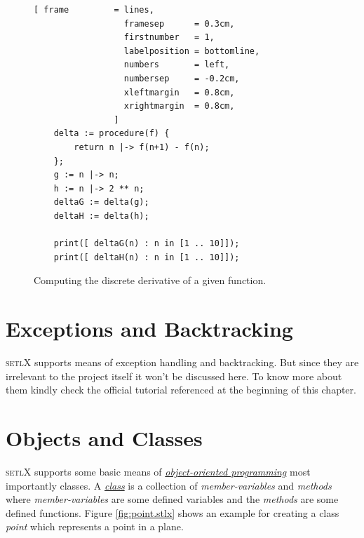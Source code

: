 \documentclass[11pt]{report}
\begin{document}
\begin{figure}[!ht]
\centering
\begin{Verbatim}[ frame         = lines, 
                  framesep      = 0.3cm, 
                  firstnumber   = 1,
                  labelposition = bottomline,
                  numbers       = left,
                  numbersep     = -0.2cm,
                  xleftmargin   = 0.8cm,
                  xrightmargin  = 0.8cm,
                ]
    delta := procedure(f) {
        return n |-> f(n+1) - f(n);
    };    
    g := n |-> n;
    h := n |-> 2 ** n;
    deltaG := delta(g);
    deltaH := delta(h);
    
    print([ deltaG(n) : n in [1 .. 10]]);
    print([ deltaH(n) : n in [1 .. 10]]);
\end{Verbatim}
\vspace*{-0.3cm}
\caption{Computing the discrete derivative of a given function.}
\label{fig:finite-difference.stlx}
\end{figure}
\pagebreak

\section{Exceptions and Backtracking}

\textsc{setlX} supports means of exception handling and backtracking. But since they are irrelevant to the project itself it won't be discussed here. To know more about them kindly check the official tutorial referenced at the beginning of this chapter. 

\section{Objects and Classes}
\textsc{setlX} supports some basic means of \href{http://en.wikipedia.org/wiki/Object-oriented_programming}{\emph{object-oriented programming}} most importantly classes. A \href{http://en.wikipedia.org/wiki/Class_(computer_programming)}{\emph{class}} is a collection of \textsl{member-variables} and \textsl{methods} where \textsl{member-variables} are some defined variables and the \textsl{methods} are some defined functions. Figure \ref{fig:point.stlx} shows an example for creating a class \textsl{point} which represents a point in a plane.
\end{document}
